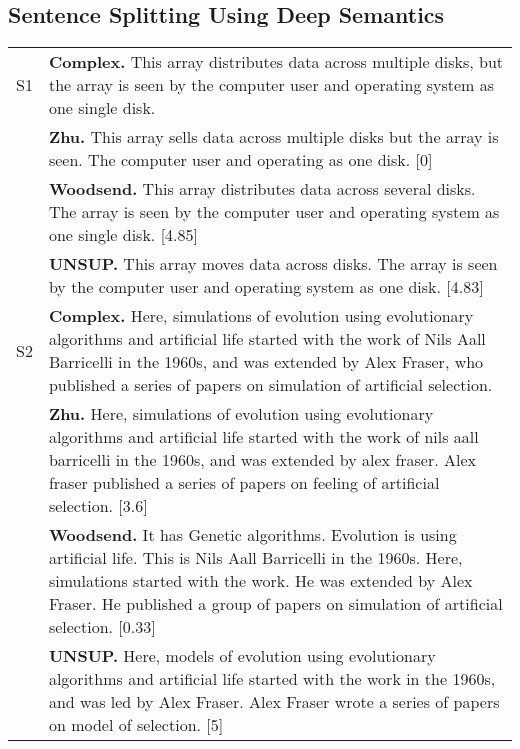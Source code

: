 \documentclass[11pt,a4paper]{article}
\begin{document}
\vspace{-0.1cm}
\subsection{Sentence Splitting Using Deep Semantics}


\begin{table*}[htbp]
  \begin{footnotesize}
    \begin{tabular}{|l|p{15cm}|}\hline
S1 &  {\bf Complex.} This array distributes data across multiple disks,
      but the array is seen by the computer user and operating system as
      one single disk. \\
      &  {\bf Zhu.} This array sells data across multiple disks but the array
      is seen. The computer user and operating as one disk. [0]\\
      &  {\bf Woodsend.} This array distributes data across several disks.
      The array is seen by the computer user and operating system as one
      single disk. [4.85]\\
      &  {\bf UNSUP.} This array moves data across disks. The array is seen
      by the computer user and operating system as one disk. [4.83]\\\hline
      S2 &   {\bf Complex.} Here, simulations of evolution using evolutionary
      algorithms and artificial life started with the work of Nils Aall
      Barricelli in the 1960s, and was extended by Alex Fraser, who
      published a series of papers on simulation of artificial
      selection. \\
      & {\bf Zhu.} Here, simulations of evolution using evolutionary
      algorithms and artificial life started with the work of nils aall
      barricelli in the 1960s, and was extended by alex fraser. Alex
      fraser published a series of papers on feeling of artificial
      selection. [3.6]\\
      & {\bf Woodsend.} It has Genetic algorithms. Evolution is using
      artificial life. This is Nils Aall Barricelli in the 1960s. Here,
      simulations started with the work. He was extended by Alex
      Fraser. He published a group of papers on simulation of artificial
      selection. [0.33]\\
      & {\bf UNSUP.} Here, models of evolution using evolutionary algorithms
      and artificial life started with the work in the 1960s, and was led
      by Alex Fraser.  Alex Fraser wrote a series of papers on model of
      selection. [5]
      \\\hline

\end{tabular}
\end{footnotesize}
\end{table*}
\end{document}
